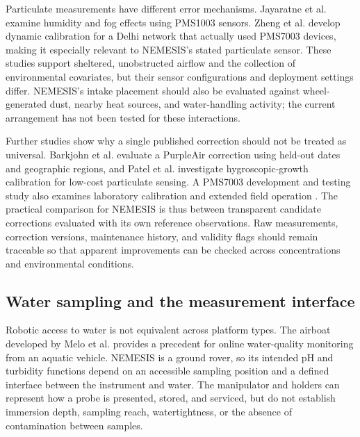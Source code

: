 \documentclass[11pt,a4paper]{article}
\begin{document}
Particulate measurements have different error mechanisms. Jayaratne et al. \citep{jayaratne2018_d2f9d3} examine humidity and fog effects using PMS1003 sensors. Zheng et al. \citep{zheng2019_9520c4} develop dynamic calibration for a Delhi network that actually used PMS7003 devices, making it especially relevant to NEMESIS’s stated particulate sensor. These studies support sheltered, unobstructed airflow and the collection of environmental covariates, but their sensor configurations and deployment settings differ. NEMESIS’s intake placement should also be evaluated against wheel-generated dust, nearby heat sources, and water-handling activity; the current arrangement has not been tested for these interactions.

Further studies show why a single published correction should not be treated as universal. Barkjohn et al. \citep{barkjohn2021_7ba5aa} evaluate a PurpleAir correction using held-out dates and geographic regions, and Patel et al. \citep{patel2024_4264a8} investigate hygroscopic-growth calibration for low-cost particulate sensing. A PMS7003 development and testing study also examines laboratory calibration and extended field operation \citep{bthory2022_c26801}. The practical comparison for NEMESIS is thus between transparent candidate corrections evaluated with its own reference observations. Raw measurements, correction versions, maintenance history, and validity flags should remain traceable so that apparent improvements can be checked across concentrations and environmental conditions.

\FloatBarrier

\subsection{Water sampling and the measurement interface}\label{sec:3.5}

Robotic access to water is not equivalent across platform types. The airboat developed by Melo et al. \citep{melo2019_023727} provides a precedent for online water-quality monitoring from an aquatic vehicle. NEMESIS is a ground rover, so its intended pH and turbidity functions depend on an accessible sampling position and a defined interface between the instrument and water. The manipulator and holders can represent how a probe is presented, stored, and serviced, but do not establish immersion depth, sampling reach, watertightness, or the absence of contamination between samples.
\end{document}
